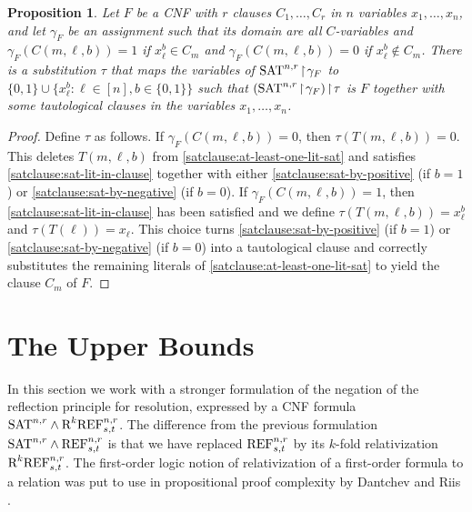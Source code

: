 \documentclass[10pt,a4paper]{article}
\newtheorem{proposition}[theorem]{Proposition}
\theoremstyle{remark}
\newtheorem*{switching lemma}{Switching Lemma}
\newtheorem*{open problem}{Open Problem}
\theoremstyle{definition}
\begin{document}
\begin{proposition}
\label{propos:subst-to-SAT}
Let $F$ be a CNF with $r$ clauses $C_1,\ldots, C_r$ in $n$ variables $x_1,\ldots, x_n$, and let $\gamma_F$ be an assignment such that its domain are all $C$-variables and $\gamma_F (C(m,\ell,b)) = 1$ if $x_\ell^b \in C_m$ and $\gamma_F (C(m,\ell,b)) = 0$ if $x_\ell^b \notin C_m$. There is a substitution $\tau$ that maps the variables of $\textnormal{SAT}^{n,r} \! \restriction \! \gamma_F$ to $\{0,1\} \cup \{ x_\ell^b : \ell \in [n], b \in \{0,1\} \}$ such that $( \textnormal{SAT}^{n,r} \! \restriction \! \gamma_F ) \! \restriction \! \tau$ is $F$ together with some tautological clauses in the variables $x_1,\ldots, x_n$. 
\end{proposition}

\begin{proof}
Define $\tau$ as follows. If $\gamma_F(C(m,\ell,b)) = 0$, then $\tau(T(m,\ell,b)) = 0$. This deletes $T(m,\ell,b)$ from \eqref{satclause:at-least-one-lit-sat} and satisfies \eqref{satclause:sat-lit-in-clause} together with either \eqref{satclause:sat-by-positive} (if $b=1$) or \eqref{satclause:sat-by-negative} (if $b=0$). 
If $\gamma_F(C(m,\ell,b)) = 1$, then \eqref{satclause:sat-lit-in-clause} has been satisfied and we define $\tau(T(m,\ell,b)) = x_\ell^b$ and $\tau(T(\ell)) = x_\ell$. This choice turns \eqref{satclause:sat-by-positive} (if $b=1$) or \eqref{satclause:sat-by-negative} (if $b=0$) into a tautological clause and correctly substitutes the remaining literals of \eqref{satclause:at-least-one-lit-sat} to yield the clause $C_m$ of $F$.
\end{proof}



\section{The Upper Bounds}
\label{sec:refl-princ-upper-bound}



In this section we work with a stronger formulation of the negation of the reflection principle for resolution, expressed by a CNF formula $\textnormal{SAT}^{n,r} \land \textnormal{R}^k\textnormal{REF}^{n,r}_{s,t}$. The difference from the previous formulation $\textnormal{SAT}^{n,r} \land \textnormal{REF}^{n,r}_{s,t}$ is that we have replaced $\textnormal{REF}^{n,r}_{s,t}$ by its $k$-fold relativization $\textnormal{R}^k\textnormal{REF}^{n,r}_{s,t}$. The first-order logic notion of relativization of a first-order formula to a relation was put to use in propositional proof complexity by Dantchev and Riis \cite{Dantchev-Riis2003}. 
\end{document}
